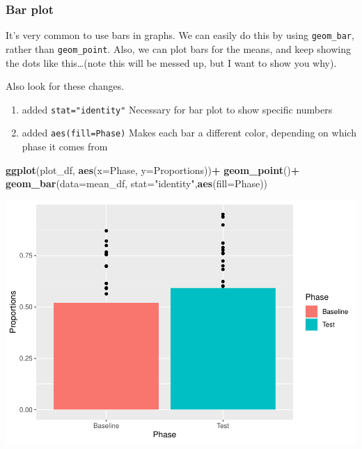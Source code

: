 \documentclass[
]{book}
\newenvironment{Shaded}{\begin{snugshade}}{\end{snugshade}}
\newcommand{\AttributeTok}[1]{\textcolor[rgb]{0.13,0.29,0.53}{#1}}
\newcommand{\FunctionTok}[1]{\textcolor[rgb]{0.13,0.29,0.53}{\textbf{#1}}}
\newcommand{\NormalTok}[1]{#1}
\newcommand{\SpecialCharTok}[1]{\textcolor[rgb]{0.81,0.36,0.00}{\textbf{#1}}}
\newcommand{\StringTok}[1]{\textcolor[rgb]{0.31,0.60,0.02}{#1}}
\providecommand{\tightlist}{%
  \setlength{\itemsep}{0pt}\setlength{\parskip}{0pt}}
\begin{document}
\hypertarget{bar-plot}{%
\subsubsection{Bar plot}\label{bar-plot}}

It's very common to use bars in graphs. We can easily do this by using \texttt{geom\_bar}, rather than \texttt{geom\_point}. Also, we can plot bars for the means, and keep showing the dots like this\ldots(note this will be messed up, but I want to show you why).

Also look for these changes.

\begin{enumerate}
\def\labelenumi{\arabic{enumi}.}
\tightlist
\item
  added \texttt{stat="identity"} Necessary for bar plot to show specific numbers
\item
  added \texttt{aes(fill=Phase)} Makes each bar a different color, depending on which phase it comes from
\end{enumerate}

\begin{Shaded}
\begin{Highlighting}[]
\FunctionTok{ggplot}\NormalTok{(plot\_df, }\FunctionTok{aes}\NormalTok{(}\AttributeTok{x=}\NormalTok{Phase, }\AttributeTok{y=}\NormalTok{Proportions))}\SpecialCharTok{+} 
  \FunctionTok{geom\_point}\NormalTok{()}\SpecialCharTok{+}
  \FunctionTok{geom\_bar}\NormalTok{(}\AttributeTok{data=}\NormalTok{mean\_df, }\AttributeTok{stat=}\StringTok{"identity"}\NormalTok{,}\FunctionTok{aes}\NormalTok{(}\AttributeTok{fill=}\NormalTok{Phase))}
\end{Highlighting}
\end{Shaded}

\includegraphics{Statistics_Lab_files/figure-latex/unnamed-chunk-177-1.pdf}
\end{document}
